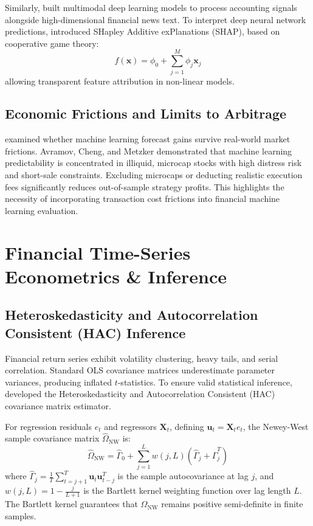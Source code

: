 Similarly, \citet{cong2021textual} built multimodal deep learning models to process accounting signals alongside high-dimensional financial news text. To interpret deep neural network predictions, \citet{lundberg2017unified} introduced SHapley Additive exPlanations (SHAP), based on cooperative game theory:
\begin{equation}
f(\mathbf{x}) = \phi_0 + \sum_{j=1}^{M} \phi_j \mathbf{x}_j
\label{eq:ch2_shap}
\end{equation}
allowing transparent feature attribution in non-linear models.

\subsection{Economic Frictions and Limits to Arbitrage}
\citet{avramov2023machine} examined whether machine learning forecast gains survive real-world market frictions. Avramov, Cheng, and Metzker demonstrated that machine learning predictability is concentrated in illiquid, microcap stocks with high distress risk and short-sale constraints. Excluding microcaps or deducting realistic execution fees significantly reduces out-of-sample strategy profits. This highlights the necessity of incorporating transaction cost frictions into financial machine learning evaluation.

\section{Financial Time-Series Econometrics \& Inference}

\subsection{Heteroskedasticity and Autocorrelation Consistent (HAC) Inference}
Financial return series exhibit volatility clustering, heavy tails, and serial correlation. Standard OLS covariance matrices underestimate parameter variances, producing inflated $t$-statistics. To ensure valid statistical inference, \citet{newey1987simple} developed the Heteroskedasticity and Autocorrelation Consistent (HAC) covariance matrix estimator.

For regression residuals $e_t$ and regressors $\mathbf{X}_t$, defining $\mathbf{u}_t = \mathbf{X}_t e_t$, the Newey-West sample covariance matrix $\widehat{\Omega}_{\text{NW}}$ is:
\begin{equation}
\widehat{\Omega}_{\text{NW}} = \widehat{\Gamma}_0 + \sum_{j=1}^{L} w(j, L) \left( \widehat{\Gamma}_j + \widehat{\Gamma}_j^T \right)
\label{eq:ch2_newey_west_eq}
\end{equation}
where $\widehat{\Gamma}_j = \frac{1}{T} \sum_{t=j+1}^{T} \mathbf{u}_t \mathbf{u}_{t-j}^T$ is the sample autocovariance at lag $j$, and $w(j, L) = 1 - \frac{j}{L+1}$ is the Bartlett kernel weighting function over lag length $L$. The Bartlett kernel guarantees that $\widehat{\Omega}_{\text{NW}}$ remains positive semi-definite in finite samples.

